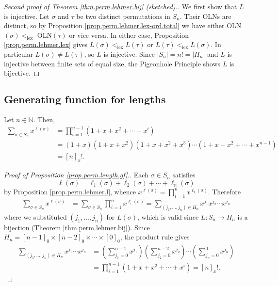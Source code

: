 \begin{proof}[Second proof of Theorem \ref{thm.perm.lehmer.bij} (sketched).]
\leanok
We first show that $L$ is injective.
Let $\sigma$ and $\tau$ be two distinct permutations in $S_n$.
Their OLNs are distinct, so by Proposition \ref{prop.perm.lehmer.lex-ord.total}
we have either OLN$(\sigma) <_{\operatorname{lex}}$ OLN$(\tau)$ or vice versa.
In either case, Proposition \ref{prop.perm.lehmer.lex} gives
$L(\sigma) <_{\operatorname{lex}} L(\tau)$ or
$L(\tau) <_{\operatorname{lex}} L(\sigma)$.
In particular $L(\sigma) \neq L(\tau)$, so $L$ is injective.
Since $|S_n| = n! = |H_n|$ and $L$ is injective between finite sets of equal size,
the Pigeonhole Principle shows $L$ is bijective.
\end{proof}

\subsection{Generating function for lengths}

\begin{proposition}
\label{prop.perm.length.gf}
\leantarget
\leanok
Let $n\in\mathbb{N}$. Then,
\begin{align*}
\sum_{\sigma\in S_{n}} x^{\ell\left(\sigma\right)}
&= \prod_{i=1}^{n-1}\left(1+x+x^{2}+\cdots+x^{i}\right) \\
&= \left(1+x\right)\left(1+x+x^{2}\right)\left(1+x+x^{2}+x^{3}\right)
\cdots\left(1+x+x^{2}+\cdots+x^{n-1}\right) \\
&= \left[n\right]_{x}!.
\end{align*}
\end{proposition}

\begin{proof}[Proof of Proposition \ref{prop.perm.length.gf}.]
\leanok
Each $\sigma\in S_{n}$ satisfies
\[
\ell\left(\sigma\right) = \ell_{1}\left(\sigma\right)+\ell_{2}\left(
\sigma\right)+\cdots+\ell_{n}\left(\sigma\right)
\]
by Proposition \ref{prop.perm.lehmer.l},
whence $x^{\ell(\sigma)} = \prod_{i=1}^{n} x^{\ell_i(\sigma)}$.
Therefore
\begin{align*}
\sum_{\sigma\in S_{n}} x^{\ell\left(\sigma\right)}
&= \sum_{\sigma\in S_{n}} \prod_{i=1}^{n} x^{\ell_i(\sigma)}
= \sum_{\left(j_{1},\ldots,j_{n}\right)\in H_{n}}
x^{j_{1}} x^{j_{2}} \cdots x^{j_{n}}
\end{align*}
where we substituted $(j_1,\ldots,j_n)$ for $L(\sigma)$, which is valid since
$L: S_n \to H_n$ is a bijection (Theorem \ref{thm.perm.lehmer.bij}).
Since $H_{n} = [n-1]_0 \times [n-2]_0 \times \cdots \times [0]_0$,
the product rule gives
\begin{align*}
\sum_{(j_1,\ldots,j_n) \in H_n} x^{j_1}\cdots x^{j_n}
&= \left(\sum_{j_1=0}^{n-1} x^{j_1}\right)
   \left(\sum_{j_2=0}^{n-2} x^{j_2}\right)
   \cdots
   \left(\sum_{j_n=0}^{0} x^{j_n}\right) \\
&= \prod_{i=1}^{n-1} \left(1+x+x^2+\cdots+x^i\right)
= [n]_x!.
\end{align*}
\end{proof}
